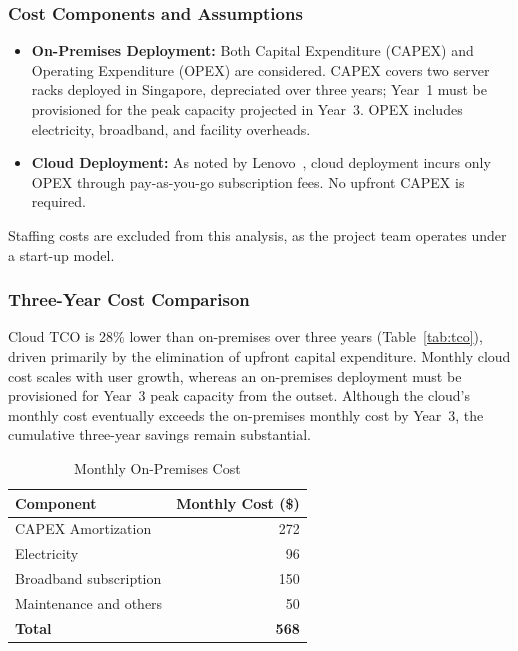\documentclass[conference]{IEEEtran}
\begin{document}
\subsubsection{Cost Components and Assumptions}

\begin{itemize}
    \item\textbf{On-Premises Deployment:} Both Capital Expenditure (CAPEX) and Operating Expenditure (OPEX) are considered. CAPEX covers two server racks deployed in Singapore, depreciated over three years; Year~1 must be provisioned for the peak capacity projected in Year~3. OPEX includes electricity, broadband, and facility overheads.
    \item\textbf{Cloud Deployment:} As noted by Lenovo~\cite{b10}, cloud deployment incurs only OPEX through pay-as-you-go subscription fees. No upfront CAPEX is required.
\end{itemize}

Staffing costs are excluded from this analysis, as the project team operates under a start-up model.

\subsubsection{Three-Year Cost Comparison}

Cloud TCO is 28\% lower than on-premises over three years (Table~\ref{tab:tco}), driven primarily by the elimination of upfront capital expenditure. Monthly cloud cost scales with user growth, whereas an on-premises deployment must be provisioned for Year~3 peak capacity from the outset. Although the cloud's monthly cost eventually exceeds the on-premises monthly cost by Year~3, the cumulative three-year savings remain substantial.

\begin{table}[H]
\caption{Monthly On-Premises Cost}
\label{tab:onprem_monthly}
\begin{center}
\begin{tabular}{lr}
\toprule
\textbf{Component} & \textbf{Monthly Cost (\$)} \\
\midrule
CAPEX Amortization & 272 \\
Electricity & 96 \\
Broadband subscription & 150 \\
Maintenance and others & 50 \\
\midrule
\textbf{Total} & \textbf{568} \\
\bottomrule
\end{tabular}
\end{center}
\end{table}
\end{document}
